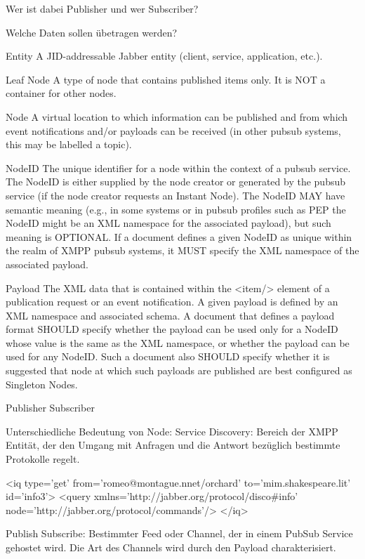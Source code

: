 \documentclass[a4paper]{article}
\begin{document}
Wer ist dabei Publisher und wer Subscriber?

Welche Daten sollen übetragen werden?

Entity
A JID-addressable Jabber entity (client, service, application, etc.).

Leaf Node
A type of node that contains published items only. It is NOT a container for other nodes.

Node
A virtual location to which information can be published and from which event notifications and/or payloads can be received (in other pubsub systems, this may be labelled a topic).

NodeID
The unique identifier for a node within the context of a pubsub service. The NodeID is either supplied by the node creator or generated by the pubsub service (if the node creator requests an Instant Node). The NodeID MAY have semantic meaning (e.g., in some systems or in pubsub profiles such as PEP the NodeID might be an XML namespace for the associated payload), but such meaning is OPTIONAL. If a document defines a given NodeID as unique within the realm of XMPP pubsub systems, it MUST specify the XML namespace of the associated payload.

Payload
The XML data that is contained within the <item/> element of a publication request or an event notification. A given payload is defined by an XML namespace and associated schema. A document that defines a payload format SHOULD specify whether the payload can be used only for a NodeID whose value is the same as the XML namespace, or whether the payload can be used for any NodeID. Such a document also SHOULD specify whether it is suggested that node at which such payloads are published are best configured as Singleton Nodes.

Publisher
Subscriber

Unterschiedliche Bedeutung von Node:
Service Discovery: Bereich der XMPP Entität, der den Umgang mit Anfragen und die Antwort bezüglich bestimmte Protokolle regelt.

<iq type='get'
    from='romeo@montague.nnet/orchard'
    to='mim.shakespeare.lit'
    id='info3'>
  <query xmlns='http://jabber.org/protocol/disco\#info' 
         node='http://jabber.org/protocol/commands'/>
</iq>
    


Publish Subscribe: Bestimmter Feed oder Channel, der in einem PubSub Service gehostet wird. Die Art des Channels wird durch den Payload charakterisiert.
\end{document}

